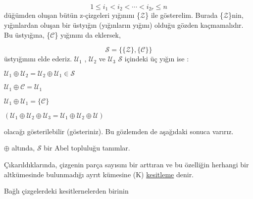 \documentclass[11pt]{amsbook}
\begin{document}

\[
	1 \leq i_1 < i_2 < \cdots < i_{2r} \leq n
\]
düğümden oluşan bütün z-çizgeleri yığınını \{$\mathscr{Z}$\} ile gösterelim. Burada \{$\mathscr{Z}$\}nin, yığınlardan oluşan bir üstyığın (yığınların yığını) olduğu gözden kaçmamalıdır. Bu üstyığına, \{$\mathscr{C}$\} yığınını da eklersek, 

\[
    \mathscr{S} = 
        \{ 
            \{\mathscr{Z}\} , 
                \{ \mathscr{C} \} 
                    \}
\]
üstyığınını elde ederiz. $\mathscr{U}_1$ , $\mathscr{U}_2$ ve $\mathscr{U}_3$ $\mathscr{S}$ içindeki üç yığın ise :\\

\begin{hEnumerateAlpha}
	\item
	$\mathscr{U}_1 
	    \oplus 
	        \mathscr{U}_2 = 
	            \mathscr{U}_2 
	                \oplus 
	                    \mathscr{U}_1 
	                        \in \mathscr{S}$
	\item 
	$\mathscr{U}_1 
	    \oplus 
	        \mathscr{C} = 
	            \mathscr{U}_1$
	\item 
	$\mathscr{U}_1 
	    \oplus 
	        \mathscr{U}_1 = 
	            \{\mathscr{C}\}$
	\item
	$(\mathscr{U}_1 
	    \oplus 
	        \mathscr{U}_2 
	            \oplus 
	                \mathscr{U}_3 = 
	                    \mathscr{U}_1 
	                        \oplus 
	                            \mathscr{U}_2 
	                                \oplus 
	                                    \mathscr{U})$\\
\end{hEnumerateAlpha}
olacağı gösterilebilir (gösteriniz). Bu gözlemden de aşağıdaki sonuca varırız. 
\begin{theorem}
    $\oplus$ altında, $\mathscr{S}$ bir Abel topluluğu tanımlar. 
\end{theorem}
\begin{theorem}
    Çıkarıldıklarında, çizgenin parça sayısını bir arttıran ve bu özelliğin herhangi bir altkümesinde bulunmadığı ayrıt kümesine (K) \underline{kesitleme} denir.
\end{theorem}
Bağlı çizgelerdeki kesitlernelerden birinin
\end{document}
